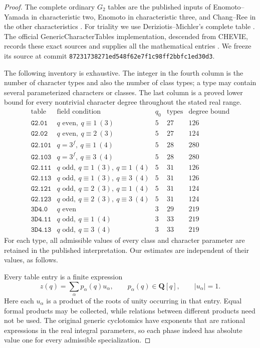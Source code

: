 \begin{proof}
The complete ordinary $G_2$ tables are the published inputs of
Enomoto--Yamada in characteristic two, Enomoto in characteristic three,
and Chang--Ree in the other characteristics
\cite{G2T:EY,G2T:Enomoto,G2T:ChangRee}.
For triality we use Deriziotis--Michler's complete table
\cite[\S4, Theorem~4.3 and Tables~3.6, 4.4]{G2T:DM}.
The official GenericCharacterTables implementation, descended from
CHEVIE, records these exact sources and supplies all the mathematical
entries \cite{G2T:GCT,G2T:CHEVIE}.
We freeze its source at commit
\texttt{87231738271ed548f62e7f1c98ff2bbfc1ed30d3}.

The following inventory is exhaustive.  The integer in the fourth
column is the number of character types and also the number of
class types; a type may contain several parameterized characters
or classes.  The last column is a proved lower bound for every
nontrivial character degree throughout the stated real range.
\[
\begin{array}{c|l|r|r|r}
\text{table}&\text{field condition}&q_0&\text{types}&\text{degree bound}\\\hline
\texttt{G2.01}&q\text{ even},\ q\equiv1\ (3)&5&27&126\\
\texttt{G2.02}&q\text{ even},\ q\equiv2\ (3)&5&27&124\\
\texttt{G2.101}&q=3^f,\ q\equiv1\ (4)&5&28&280\\
\texttt{G2.103}&q=3^f,\ q\equiv3\ (4)&5&28&280\\
\texttt{G2.111}&q\text{ odd},\ q\equiv1\ (3),\ q\equiv1\ (4)&5&31&126\\
\texttt{G2.113}&q\text{ odd},\ q\equiv1\ (3),\ q\equiv3\ (4)&5&31&126\\
\texttt{G2.121}&q\text{ odd},\ q\equiv2\ (3),\ q\equiv1\ (4)&5&31&124\\
\texttt{G2.123}&q\text{ odd},\ q\equiv2\ (3),\ q\equiv3\ (4)&5&31&124\\
\texttt{3D4.0}&q\text{ even}&3&29&219\\
\texttt{3D4.11}&q\text{ odd},\ q\equiv1\ (4)&3&33&219\\
\texttt{3D4.13}&q\text{ odd},\ q\equiv3\ (4)&3&33&219
\end{array}                                                    \tag{G2T.2}
\]
For each type, all admissible values of every class and character
parameter are retained in the published interpretation.  Our estimates
are independent of their values, as follows.

Every table entry is a finite expression
\[
                z(q)=\sum_\alpha p_\alpha(q)u_\alpha,
                \qquad p_\alpha(q)\in\mathbf Q[q],
                \qquad |u_\alpha|=1.                       \tag{G2T.3}
\]
Here each $u_\alpha$ is a product of the roots of unity occurring
in that entry.  Equal formal products may be collected, while
relations between different products need not be used.  The
original generic cyclotomics have exponents that are rational
expressions in the real integral parameters, so each phase
indeed has absolute value one for every admissible specialization.


\end{proof}
